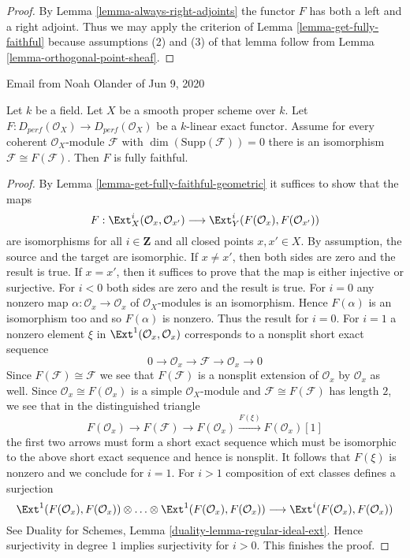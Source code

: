 \begin{proof}
By Lemma \ref{lemma-always-right-adjoints} the functor $F$
has both a left and a right adjoint. Thus we may apply the criterion
of Lemma \ref{lemma-get-fully-faithful}
because assumptions (2) and (3) of that lemma
follow from Lemma \ref{lemma-orthogonal-point-sheaf}.
\end{proof}

\begin{lemma}
\label{lemma-noah-pre}
\begin{reference}
Email from Noah Olander of Jun 9, 2020
\end{reference}
Let $k$ be a field. Let $X$ be a smooth proper scheme over $k$.
Let $F : D_{perf}(\mathcal{O}_X) \to D_{perf}(\mathcal{O}_X)$
be a $k$-linear exact functor. Assume for every coherent
$\mathcal{O}_X$-module $\mathcal{F}$ with $\dim(\text{Supp}(\mathcal{F})) = 0$
there is an isomorphism $\mathcal{F} \cong F(\mathcal{F})$.
Then $F$ is fully faithful.
\end{lemma}

\begin{proof}
By Lemma \ref{lemma-get-fully-faithful-geometric} it suffices to show
that the maps
$$
F : \Ext^i_X(\mathcal{O}_x, \mathcal{O}_{x'})
\longrightarrow
\Ext^i_Y(F(\mathcal{O}_x), F(\mathcal{O}_{x'}))
$$
are isomorphisms for all $i \in \mathbf{Z}$ and all closed points
$x, x' \in X$. By assumption, the source and the target are isomorphic.
If $x \not = x'$, then both sides are zero and the result is true.
If $x = x'$, then it suffices to prove that the map is either injective
or surjective. For $i < 0$ both sides are zero and the result is true.
For $i = 0$ any nonzero map $\alpha : \mathcal{O}_x \to \mathcal{O}_x$ of
$\mathcal{O}_X$-modules is an isomorphism. Hence $F(\alpha)$ is an
isomorphism too and so $F(\alpha)$ is nonzero. Thus the result for $i = 0$.
For $i = 1$ a nonzero element $\xi$ in $\Ext^1(\mathcal{O}_x, \mathcal{O}_x)$
corresponds to a nonsplit short exact sequence
$$
0 \to \mathcal{O}_x \to \mathcal{F} \to \mathcal{O}_x \to 0
$$
Since $F(\mathcal{F}) \cong \mathcal{F}$ we see that $F(\mathcal{F})$
is a nonsplit extension of $\mathcal{O}_x$ by $\mathcal{O}_x$ as well.
Since $\mathcal{O}_x \cong F(\mathcal{O}_x)$ is a simple
$\mathcal{O}_X$-module and $\mathcal{F} \cong F(\mathcal{F})$ has
length $2$, we see that in the distinguished triangle
$$
F(\mathcal{O}_x) \to F(\mathcal{F}) \to F(\mathcal{O}_x)
\xrightarrow{F(\xi)} F(\mathcal{O}_x)[1]
$$
the first two arrows must form a short exact sequence which must be
isomorphic to the above short exact sequence and hence is nonsplit.
It follows that $F(\xi)$ is nonzero and we conclude for $i = 1$.
For $i > 1$ composition of ext classes defines a surjection
$$
\Ext^1(F(\mathcal{O}_x), F(\mathcal{O}_x)) \otimes \ldots \otimes
\Ext^1(F(\mathcal{O}_x), F(\mathcal{O}_x))
\longrightarrow
\Ext^i(F(\mathcal{O}_x), F(\mathcal{O}_x))
$$
See Duality for Schemes, Lemma \ref{duality-lemma-regular-ideal-ext}.
Hence surjectivity in degree $1$ implies surjectivity for $i > 0$.
This finishes the proof.
\end{proof}










